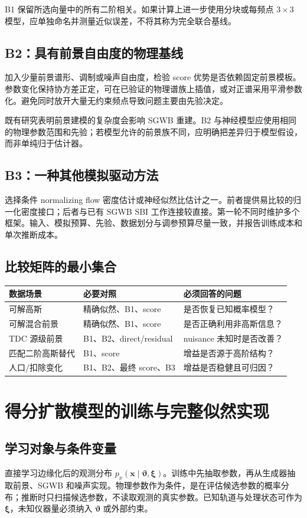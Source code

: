 \documentclass[UTF8,fontset=fandol,a4paper,11pt]{ctexart}
\numberwithin{equation}{section}
\newcommand{\btheta}{\boldsymbol\vartheta}
\newcommand{\bxi}{\boldsymbol\xi}
\newcommand{\bx}{\boldsymbol x}
\begin{document}
B1 保留所选向量中的所有二阶相关。如果计算上进一步使用分块或每频点 $3\times3$ 模型，应单独命名并测量近似误差，不将其称为完全联合基线。

\subsection{B2：具有前景自由度的物理基线}
加入少量前景谱形、调制或噪声自由度，检验 score 优势是否依赖固定前景模板。参数变化保持协方差正定，可在已验证的物理谱族上插值，或对正谱采用平滑参数化。避免同时放开大量无约束频点导致问题主要由先验决定。

既有研究表明前景建模的复杂度会影响 SGWB 重建\cite{foregroundmodel}。B2 与神经模型应使用相同的物理参数范围和先验；若模型允许的前景族不同，应明确把差异归于模型假设，而非单纯归于估计器。

\subsection{B3：一种其他模拟驱动方法}
选择条件 normalizing flow 密度估计或神经似然比估计之一。前者提供易比较的归一化密度接口；后者与已有 SGWB SBI 工作连接较直接\cite{saqqara}。第一轮不同时维护多个框架。输入、模拟预算、先验、数据划分与调参预算尽量一致，并报告训练成本和单次推断成本。

\subsection{比较矩阵的最小集合}
\noindent\begin{tabularx}{\linewidth}{P{2.7cm}Y Y}
\toprule 数据场景 & 必要对照 & 必须回答的问题\\\midrule
可解高斯 & 精确似然、B1、score & 是否恢复已知概率模型？\\
可解混合前景 & 精确似然、B1、score & 是否正确利用非高斯信息？\\
TDC 源级前景 & B1、B2、direct/residual & nuisance 未知时是否改善？\\
匹配二阶高斯替代 & B1、score & 增益是否源于高阶结构？\\
人口/扣除变化 & B1、B2、最终 score、B3 & 增益是否稳健且可归因？\\\bottomrule
\end{tabularx}

\section{得分扩散模型的训练与完整似然实现}
\subsection{学习对象与条件变量}
直接学习边缘化后的观测分布 $p_x(\bx\mid\btheta,\bxi)$。训练中先抽取参数，再从生成器抽取前景、SGWB 和噪声实现。物理参数作为条件，是在评估候选参数的概率分布；推断时只扫描候选参数，不读取观测的真实参数。已知轨道与处理状态可作为 $\bxi$，未知仪器量必须纳入 $\btheta$ 或外部约束。
\end{document}
